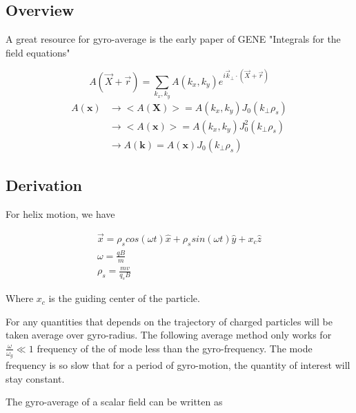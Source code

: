 \subsection{Overview}
A great resource for gyro-average is the early paper of GENE\cite{merz} "Integrals for the field equations"

\begin{equation}
A(\vec{X}+\vec{r})=\sum_{k_{x}, k_{y}} A\left(k_{x}, k_{y}\right) e^{i \vec{k}_{\perp} \cdot(\vec{X}+\vec{r})}
\end{equation}
\begin{equation}
\begin{aligned}
    A(\textbf{x})
    {}&\longrightarrow< A(\textbf{X})>=A\left(k_{x}, k_{y}\right)J_0(k_\perp \rho_s)\\
    &\longrightarrow< A(\textbf{x})>=A\left(k_{x}, k_{y}\right)J_0^2(k_\perp \rho_s)\\
    &\longrightarrow A(\textbf{k})=A(\textbf{x})J_0(k_\perp \rho_s)
    \end{aligned}
\end{equation}


\subsection{Derivation}

For helix motion, we have

\begin{eqnarray}
    \Vec{x}= \rho_s cos(\omega t)\hat{x}+\rho_s sin(\omega t)\hat{y}+ x_{c} \hat{z}\\
    \omega =\frac{qB}{m}\\
    \rho_s=\frac{mv}{q_sB}
\end{eqnarray}

Where $x_{c}$ is the guiding center of the particle.

For any quantities that depends on the trajectory of charged particles will be taken average over gyro-radius. The following average method only works for $\frac{\omega}{\omega_g}\ll 1$ frequency of the of mode less than the gyro-frequency. The mode frequency is so slow that for a period of gyro-motion, the quantity of interest will stay constant.

The gyro-average of a scalar ﬁeld can be written as


